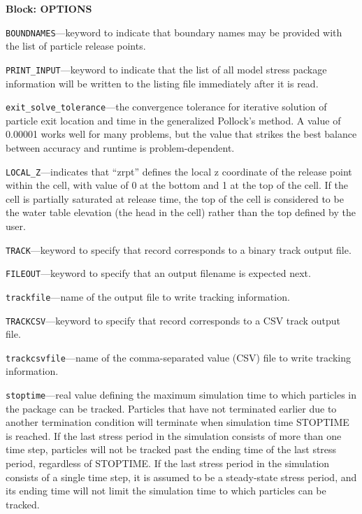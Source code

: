 
\item \textbf{Block: OPTIONS}

\begin{description}
\item \texttt{BOUNDNAMES}---keyword to indicate that boundary names may be provided with the list of particle release points.

\item \texttt{PRINT\_INPUT}---keyword to indicate that the list of all model stress package information will be written to the listing file immediately after it is read.

\item \texttt{exit\_solve\_tolerance}---the convergence tolerance for iterative solution of particle exit location and time in the generalized Pollock's method.  A value of 0.00001 works well for many problems, but the value that strikes the best balance between accuracy and runtime is problem-dependent.

\item \texttt{LOCAL\_Z}---indicates that ``zrpt'' defines the local z coordinate of the release point within the cell, with value of 0 at the bottom and 1 at the top of the cell.  If the cell is partially saturated at release time, the top of the cell is considered to be the water table elevation (the head in the cell) rather than the top defined by the user.

\item \texttt{TRACK}---keyword to specify that record corresponds to a binary track output file.

\item \texttt{FILEOUT}---keyword to specify that an output filename is expected next.

\item \texttt{trackfile}---name of the output file to write tracking information.

\item \texttt{TRACKCSV}---keyword to specify that record corresponds to a CSV track output file.

\item \texttt{trackcsvfile}---name of the comma-separated value (CSV) file to write tracking information.

\item \texttt{stoptime}---real value defining the maximum simulation time to which particles in the package can be tracked.  Particles that have not terminated earlier due to another termination condition will terminate when simulation time STOPTIME is reached.  If the last stress period in the simulation consists of more than one time step, particles will not be tracked past the ending time of the last stress period, regardless of STOPTIME.  If the last stress period in the simulation consists of a single time step, it is assumed to be a steady-state stress period, and its ending time will not limit the simulation time to which particles can be tracked.


\end{description}
